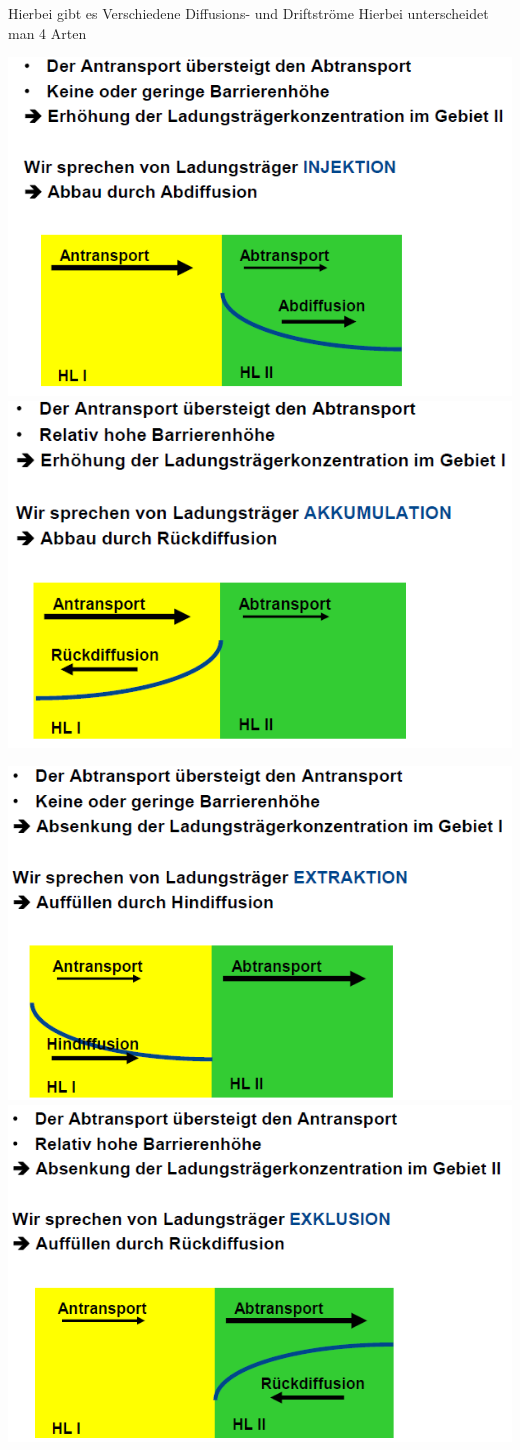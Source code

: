 	Hierbei gibt es Verschiedene Diffusions- und Driftströme
	Hierbei unterscheidet man 4 Arten
	\newline
		\begin{center}
			\includegraphics[width=0.45\linewidth]{Kapitel/Kap05/Interjektion}
			\includegraphics[width=0.45\linewidth]{Kapitel/Kap05/Akkumulation}
		\end{center}
	
		\begin{center}
			\includegraphics[width=0.45\linewidth]{Kapitel/Kap05/Extraktion}
			\includegraphics[width=0.45\linewidth]{Kapitel/Kap05/Exlusion}		
		\end{center}
			
